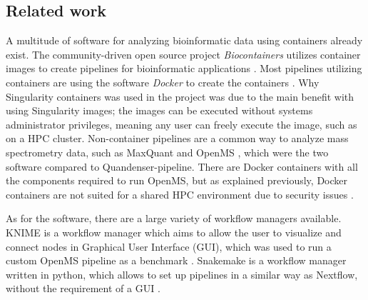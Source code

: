 \subsection{Related work}
A multitude of software for analyzing bioinformatic data using containers already exist. The community-driven open source project \textit{Biocontainers} utilizes container images to create pipelines for bioinformatic applications \cite{biocontainers}. Most pipelines utilizing containers are using the software \textit{Docker} to create the containers \cite{docker}. Why Singularity containers was used in the project was due to the main benefit with using Singularity images; the images can be executed without systems administrator privileges, meaning any user can freely execute the image, such as on a HPC cluster. Non-container pipelines are a common way to analyze mass spectrometry data, such as MaxQuant and OpenMS \cite{maxquant} \cite{openms}, which were the two software compared to Quandenser-pipeline. There are Docker containers with all the components required to run OpenMS, but as explained previously, Docker containers are not suited for a shared HPC environment due to security issues \cite{openms-hpc}.

As for the software, there are a large variety of workflow managers available. KNIME is a workflow manager which aims to allow the user to visualize and connect nodes in Graphical User Interface (GUI), which was used to run a custom OpenMS pipeline as a benchmark \cite{knime}. Snakemake is a workflow manager written in python, which allows to set up pipelines in a similar way as Nextflow, without the requirement of a GUI \cite{snakemake}.
